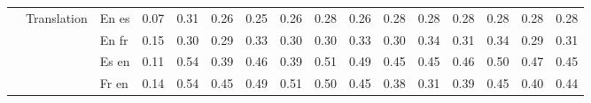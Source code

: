 \begin{center}
\begin{longtable}{lllrrrrrrrrrrrrr}
\cline{2-16}
 & \multirow[t]{4}{*}{Translation} & En es & 0.07 & 0.31 & 0.26 & 0.25 & 0.26 & 0.28 & 0.26 & 0.28 & 0.28 & 0.28 & 0.28 & 0.28 & 0.28 \\
 &  & En fr & 0.15 & 0.30 & 0.29 & 0.33 & 0.30 & 0.30 & 0.33 & 0.30 & 0.34 & 0.31 & 0.34 & 0.29 & 0.31 \\
 &  & Es en & 0.11 & 0.54 & 0.39 & 0.46 & 0.39 & 0.51 & 0.49 & 0.45 & 0.45 & 0.46 & 0.50 & 0.47 & 0.45 \\
 &  & Fr en & 0.14 & 0.54 & 0.45 & 0.49 & 0.51 & 0.50 & 0.45 & 0.38 & 0.31 & 0.39 & 0.45 & 0.40 & 0.44 \\
\cline{1-16} \cline{2-16}
\bottomrule
\end{longtable}

\end{center}
\twocolumn
